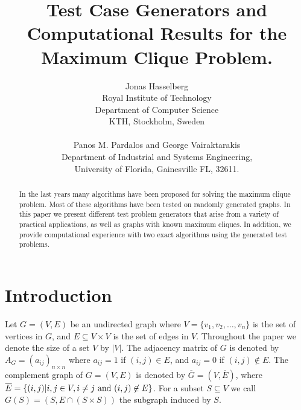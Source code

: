 
\renewcommand{\baselinestretch}{1.2}
\textwidth 16cm
\textheight 23cm
\topmargin -0.9in
\evensidemargin 0.00in
\oddsidemargin 0.00in

\newtheorem{Theorem}{Theorem}
\newtheorem{Corollary}{Corollary}
\newtheorem{Lemma}{Lemma}
\newtheorem{Definition}{Definition}
\newtheorem{Property}{Property}
\newtheorem{Proposition}{Proposition}
\newtheorem{example}{Example}




\title{Test Case Generators and Computational Results for the Maximum Clique
Problem.}
\author{Jonas Hasselberg \\ Royal Institute of Technology \\
Department of Computer Science \\
KTH, Stockholm, Sweden \\  \\
Panos M. Pardalos and George Vairaktarakis \\
Department of Industrial and Systems Engineering, \\ University of Florida,
Gainesville FL, 32611.}
\date{}
\maketitle


\begin{abstract}
In the last years many algorithms have been proposed for solving the
maximum clique problem. Most of these algorithms have been tested on
randomly generated graphs. In this paper we present different test problem
generators that arise from a variety of practical applications, as well
as graphs with known maximum cliques. In addition, we provide
computational experience with two exact algorithms using the generated
test problems.
\end{abstract}

\section{Introduction}

Let $G = (V,E)$ be an undirected graph where $V =
\{v_{1},v_{2},\ldots,v_{n}\}$ is the set of vertices in $G$, and
$E\subseteq V\times V$ is the set of edges in $V$. Throughout the
paper we denote the size of a set $V$ by $|V|$.
The adjacency matrix of $G$ is
denoted by $A_{G} = (a_{ij})_{n\times n}$ where $a_{ij} = 1$ if
$(i,j)\in E$, and $a_{ij} = 0$ if $(i,j)\not\in E$.
The complement graph of $G = (V,E)$ is denoted by $\overline{G} =
(V,\overline{E})$, where $\overline{E} = \{(i,j)|i,j
\in V, i \neq j\ {\rm and}\ (i,j)\not\in E\}$. For a subset $S\subseteq V$ we
call $G(S) = (S,E \cap (S \times S))$ the subgraph induced by $S$.

